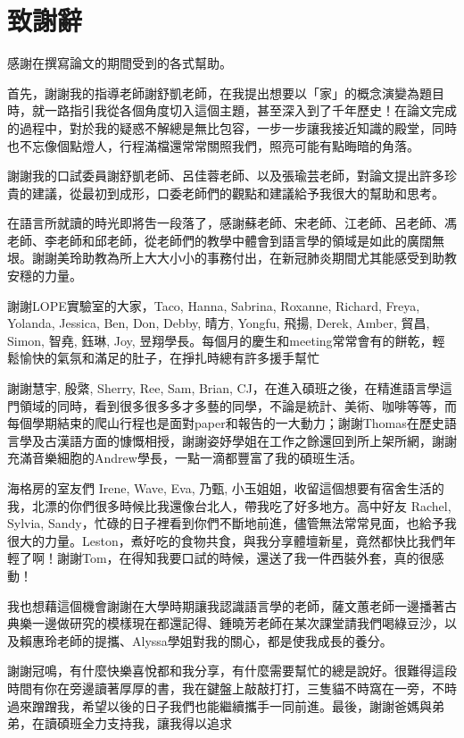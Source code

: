 

\chapter*{致謝辭}
感謝在撰寫論文的期間受到的各式幫助。

首先，謝謝我的指導老師謝舒凱老師，在我提出想要以「家」的概念演變為題目時，就一路指引我從各個角度切入這個主題，甚至深入到了千年歷史！在論文完成的過程中，對於我的疑惑不解總是無比包容，一步一步讓我接近知識的殿堂，同時也不忘像個點燈人，行程滿檔還常常關照我們，照亮可能有點晦暗的角落。

謝謝我的口試委員謝舒凱老師、呂佳蓉老師、以及張瑜芸老師，對論文提出許多珍貴的建議，從最初到成形，口委老師們的觀點和建議給予我很大的幫助和思考。

在語言所就讀的時光即將吿一段落了，感謝蘇老師、宋老師、江老師、呂老師、馮老師、李老師和邱老師，從老師們的教學中體會到語言學的領域是如此的廣闊無垠。謝謝美玲助教為所上大大小小的事務付出，在新冠肺炎期間尤其能感受到助教安穩的力量。

謝謝LOPE實驗室的大家，Taco, Hanna, Sabrina, Roxanne, Richard, Freya, Yolanda, Jessica, Ben, Don, Debby, 晴方, Yongfu, 飛揚, Derek, Amber, 貿昌, Simon, 智堯, 鈺琳, Joy, 昱翔學長。每個月的慶生和meeting常常會有的餅乾，輕鬆愉快的氣氛和滿足的肚子，在掙扎時總有許多援手幫忙

謝謝慧宇, 殷綮, Sherry, Ree, Sam, Brian, CJ，在進入碩班之後，在精進語言學這門領域的同時，看到很多很多多才多藝的同學，不論是統計、美術、咖啡等等，而每個學期結束的爬山行程也是面對paper和報告的一大動力；謝謝Thomas在歷史語言學及古漢語方面的慷慨相授，謝謝姿妤學姐在工作之餘還回到所上架所網，謝謝充滿音樂細胞的Andrew學長，一點一滴都豐富了我的碩班生活。

海格房的室友們 Irene, Wave, Eva, 乃甄, 小玉姐姐，收留這個想要有宿舍生活的我，北漂的你們很多時候比我還像台北人，帶我吃了好多地方。高中好友 Rachel, Sylvia, Sandy，忙碌的日子裡看到你們不斷地前進，儘管無法常常見面，也給予我很大的力量。Leston，煮好吃的食物共食，與我分享體壇新星，竟然都快比我們年輕了啊！謝謝Tom，在得知我要口試的時候，還送了我一件西裝外套，真的很感動！

我也想藉這個機會謝謝在大學時期讓我認識語言學的老師，薩文蕙老師一邊播著古典樂一邊做研究的模樣現在都還記得、鍾曉芳老師在某次課堂請我們喝綠豆沙，以及賴惠玲老師的提攜、Alyssa學姐對我的關心，都是使我成長的養分。

謝謝冠鳴，有什麼快樂喜悅都和我分享，有什麼需要幫忙的總是說好。很難得這段時間有你在旁邊讀著厚厚的書，我在鍵盤上敲敲打打，三隻貓不時窩在一旁，不時過來蹭蹭我，希望以後的日子我們也能繼續攜手一同前進。最後，謝謝爸媽與弟弟，在讀碩班全力支持我，讓我得以追求

